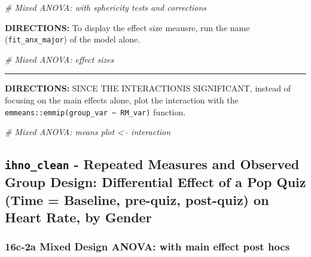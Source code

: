 \documentclass[]{article}
\newenvironment{Shaded}{\begin{snugshade}}{\end{snugshade}}
\newcommand{\CommentTok}[1]{\textcolor[rgb]{0.56,0.35,0.01}{\textit{#1}}}
\begin{document}
\begin{Shaded}
\begin{Highlighting}[]
\CommentTok{# Mixed ANOVA:  with sphericity tests and corrections}
\end{Highlighting}
\end{Shaded}

\clearpage

\textbf{DIRECTIONS:} To display the effect size meausre, run the name
(\texttt{fit\_anx\_major}) of the model alone.

\begin{Shaded}
\begin{Highlighting}[]
\CommentTok{# Mixed ANOVA: effect sizes }
\end{Highlighting}
\end{Shaded}

\begin{center}\rule{0.5\linewidth}{\linethickness}\end{center}

\textbf{DIRECTIONS:} SINCE THE INTERACTIONIS SIGNIFICANT, instead of
focusing on the main effects alone, plot the interaction with the
\texttt{emmeans::emmip(group\_var\ \textasciitilde{}\ RM\_var)}
function.

\begin{Shaded}
\begin{Highlighting}[]
\CommentTok{# Mixed ANOVA: means plot <-- interaction}
\end{Highlighting}
\end{Shaded}

\clearpage

\subsection{\texorpdfstring{\texttt{ihno\_clean} - Repeated Measures and
Observed Group Design: Differential Effect of a Pop Quiz (Time =
Baseline, pre-quiz, post-quiz) on Heart Rate, by
Gender}{ihno\_clean - Repeated Measures and Observed Group Design: Differential Effect of a Pop Quiz (Time = Baseline, pre-quiz, post-quiz) on Heart Rate, by Gender}}\label{ihno_clean---repeated-measures-and-observed-group-design-differential-effect-of-a-pop-quiz-time-baseline-pre-quiz-post-quiz-on-heart-rate-by-gender}

\subsubsection{16c-2a Mixed Design ANOVA: with main effect post
hocs}\label{c-2a-mixed-design-anova-with-main-effect-post-hocs}
\end{document}
